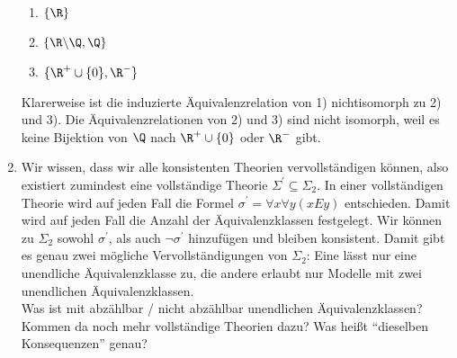 \begin{solution}
\begin{enumerate}[label = \alph*.]
\begin{enumerate}[label = \arabic*)]
  \item $\{\R\}$
  \item $\{\R\backslash\Q,\Q\}$
  \item $\{\R^+\cup\{0\},\R^-\}$
\end{enumerate}
Klarerweise ist die induzierte Äquivalenzrelation von 1) nichtisomorph zu 2) und 3).
Die Äquivalenzrelationen von 2) und 3) sind nicht isomorph, weil es keine Bijektion von
$\Q$ nach $\R^+\cup\{0\}$ oder $\R^-$ gibt.
\item Wir wissen, dass wir alle konsistenten Theorien vervollständigen können,
also existiert zumindest eine vollständige Theorie $\Sigma^{\prime} \subseteq \Sigma_2$.
In einer vollständigen Theorie wird auf jeden Fall die Formel
$\sigma^{\prime} = \forall x \forall y (xEy)$ entschieden. Damit wird auf jeden Fall die Anzahl
der Äquivalenzklassen festgelegt. Wir können zu $\Sigma_2$ sowohl $\sigma^{\prime}$,
als auch $\neg \sigma^{\prime}$ hinzufügen und bleiben konsistent.
Damit gibt es genau zwei mögliche Vervollständigungen von $\Sigma_2$:
Eine lässt nur eine unendliche Äquivalenzklasse zu, die andere erlaubt nur Modelle mit
zwei unendlichen Äquivalenzklassen. \\
Was ist mit abzählbar / nicht abzählbar unendlichen Äquivalenzklassen?
Kommen da noch mehr vollständige Theorien dazu?
Was heißt ``dieselben Konsequenzen''  genau?
\end{enumerate}

\end{solution}

